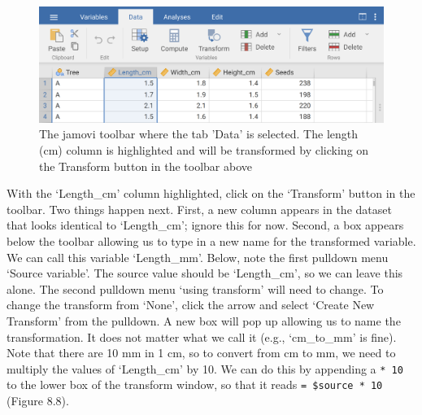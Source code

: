 \documentclass[
]{scrbook}
\begin{document}
\begin{figure}
\includegraphics[width=1\linewidth]{img/jamovi_transform_fig_length} \caption{The jamovi toolbar where the tab 'Data' is selected. The length (cm) column is highlighted and will be transformed by clicking on the Transform button in the toolbar above}\label{fig:unnamed-chunk-31}
\end{figure}

With the `Length\_cm' column highlighted, click on the `Transform' button in the toolbar.
Two things happen next.
First, a new column appears in the dataset that looks identical to `Length\_cm'; ignore this for now.
Second, a box appears below the toolbar allowing us to type in a new name for the transformed variable.
We can call this variable `Length\_mm'.
Below, note the first pulldown menu `Source variable'.
The source value should be `Length\_cm', so we can leave this alone.
The second pulldown menu `using transform' will need to change.
To change the transform from `None', click the arrow and select `Create New Transform' from the pulldown.
A new box will pop up allowing us to name the transformation.
It does not matter what we call it (e.g., `cm\_to\_mm' is fine).
Note that there are 10 mm in 1 cm, so to convert from cm to mm, we need to multiply the values of `Length\_cm' by 10.
We can do this by appending a \texttt{*\ 10} to the lower box of the transform window, so that it reads \texttt{=\ \$source\ *\ 10} (Figure 8.8).
\end{document}

